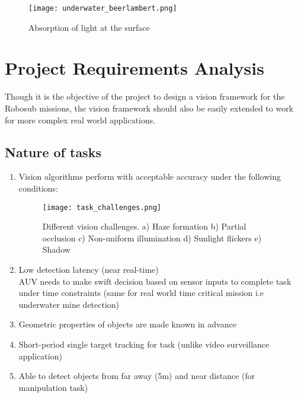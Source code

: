 \begin{figure}[ht]
\centering

        \texttt{[image: underwater\_beerlambert.png]}
        \caption{Absorption of light at the surface}
        \label{fig:water_surface_effect}

\end{figure}

\section{Project Requirements Analysis}
Though it is the objective of the project to design a vision framework for the Robosub missions, the vision framework should also be easily extended to work for more complex real world applications. 

\subsection{Nature of tasks}
\begin{enumerate}
    \item Vision algorithms perform with acceptable accuracy under the following conditions:
    \begin{figure}[ht]
    \centering
            \texttt{[image: task\_challenges.png]}
            \caption{Different vision challenges. a) Haze formation b) Partial occlusion c) Non-uniform illumination d) Sunlight flickers e) Shadow}
            \label{fig:vision_challenges}
    \end{figure}
    \item Low detection latency (near real-time) \\
        AUV needs to make swift decision based on sensor inputs to complete task under time constraints (same for real world time critical mission i.e underwater mine detection)
    \item Geometric properties of objects are made known in advance
    \item Short-period single target tracking for  task (unlike video surveillance application)
    \item Able to detect objects from far away (5m) and near distance (for manipulation task)
\end{enumerate}
